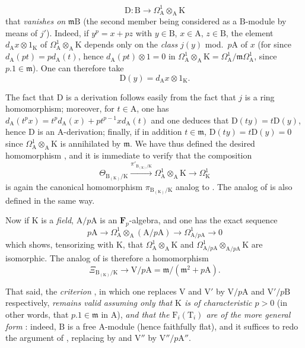 \begin{remark}[22.4.8]
\[\label{0.22.4.8.3}
  \mathrm{D}:\mathrm{B}\to\Omega^1_\mathrm{A}\otimes_\mathrm{A}\mathrm{K}
  \tag{22.4.8.3}
\]
that \emph{vanishes on} $\mathfrak{m}\mathrm{B}$ (the second member being considered as a $\mathrm{B}$-module by means of $j'$).
Indeed, if $y^p=x+pz$ with $y\in\mathrm{B}$, $x\in\mathrm{A}$, $z\in\mathrm{B}$, the element $d_\mathrm{A}x\otimes 1_\mathrm{K}$ of $\Omega^1_\mathrm{A}\otimes_\mathrm{A}\mathrm{K}$ depends only on the \emph{class} $j(y)$ mod.~$p\mathrm{A}$ of $x$ (for since $d_\mathrm{A}(pt)=pd_\mathrm{A}(t)$, hence $d_\mathrm{A}(pt)\otimes 1=0$ in $\Omega^1_\mathrm{A}\otimes_\mathrm{A}\mathrm{K}=\Omega^1_\mathrm{A}/\mathfrak{m}\Omega^1_\mathrm{A}$, since $p.1\in\mathfrak{m}$).
One can therefore take
\[
  \mathrm{D}(y)=d_\mathrm{A}x\otimes 1_\mathrm{K}.
\]

The fact that $\mathrm{D}$ is a derivation follows easily from the fact that $j$ is a ring homomorphism; moreover, for $t\in\mathrm{A}$, one has $d_\mathrm{A}(t^px)=t^pd_\mathrm{A}(x)+pt^{p-1}xd_\mathrm{A}(t)$ and one deduces that $\mathrm{D}(ty)=t\mathrm{D}(y)$, hence $\mathrm{D}$ is an $\mathrm{A}$-derivation; finally, if in addition $t\in\mathfrak{m}$, $\mathrm{D}(ty)=t\mathrm{D}(y)=0$ since $\Omega^1_\mathrm{A}\otimes_\mathrm{A}\mathrm{K}$ is annihilated by $\mathfrak{m}$.
We have thus defined the desired homomorphism , and it is immediate to verify that the composition
\[
  \Theta_{\mathrm{B}_{(\mathrm{K})}/\mathrm{K}}\xrightarrow{\pi'_{\mathrm{B}_{(\mathrm{K})}/\mathrm{K}}}\Omega^1_\mathrm{A}\otimes_\mathrm{A}\mathrm{K}\to\Omega^1_\mathrm{K}
\]
is again the canonical homomorphism $\pi_{\mathrm{B}_{(\mathrm{K})}/\mathrm{K}}$ analog to .
The analog of  is also defined in the same way.

Now if $\mathrm{K}$ is a \emph{field}, $\mathrm{A}/p\mathrm{A}$ is an $\mathbf{F}_p$-algebra, and one has the exact sequence 
\[
  p\mathrm{A}\to\Omega^1_\mathrm{A}\otimes_\mathrm{A}(\mathrm{A}/p\mathrm{A})\to\Omega^1_{\mathrm{A}/p\mathrm{A}}\to 0
\]
which shows, tensorizing with $\mathrm{K}$, that $\Omega^1_\mathrm{A}\otimes_\mathrm{A}\mathrm{K}$ and $\Omega^1_{\mathrm{A}/p\mathrm{A}}\otimes_{\mathrm{A}/p\mathrm{A}}\mathrm{K}$ are isomorphic.
The analog of  is therefore a homomorphism
\[
\label{0.22.4.8.4}
  \Xi_{\mathrm{B}_{(\mathrm{K})}/\mathrm{K}}\to\mathrm{V}/p\mathrm{A}=\mathfrak{m}/(\mathfrak{m}^2+p\mathrm{A}).
  \tag{22.4.8.4}
\]

That said, the \emph{criterion} , in which one replaces $\mathrm{V}$ and $\mathrm{V}'$ by $\mathrm{V}/p\mathrm{A}$ and $\mathrm{V}'/p\mathrm{B}$ respectively, \emph{remains valid assuming only that $\mathrm{K}$ is of characteristic $p>0$} (in other words, that $p.1\in\mathfrak{m}$ in $\mathrm{A}$), \emph{and that the $\mathrm{F}_i(\mathrm{T}_i)$ are of the more general form} : indeed, $\mathrm{B}$ is a free $\mathrm{A}$-module (hence faithfully flat), and it suffices to redo the argument of , replacing  by  and $\mathrm{V}''$ by $\mathrm{V}''/p\mathrm{A}''$.
\end{remark}

